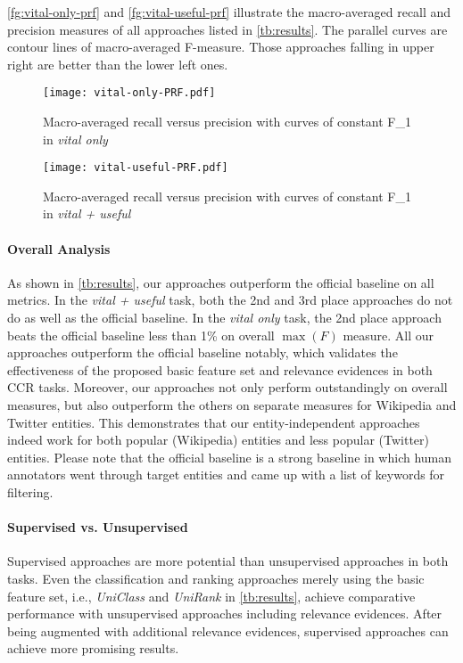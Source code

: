\documentclass{sig-alternate}
\begin{document}
\autoref{fg:vital-only-prf} and \autoref{fg:vital-useful-prf} illustrate the macro-averaged recall and precision measures of all approaches listed in \autoref{tb:results}. The parallel curves are contour lines of macro-averaged F-measure. Those approaches falling in upper right are better than the lower left ones.

\begin{figure}[thbp]
\centering
\texttt{[image: vital-only-PRF.pdf]}
\caption{Macro-averaged recall versus precision with curves of constant F\_1 in \textit{vital only}}
\label{fg:vital-only-prf}
\end{figure}
\begin{figure}[thbp]
\centering
\texttt{[image: vital-useful-PRF.pdf]}
\caption{Macro-averaged recall versus precision with curves of constant F\_1 in \textit{vital + useful}}
\label{fg:vital-useful-prf}
\end{figure}

\paragraph{Overall Analysis}
As shown in \autoref{tb:results}, our approaches outperform the official baseline on all metrics. In the \textit{vital + useful} task, both the 2nd and 3rd place approaches do not do as well as the official baseline. In the \textit{vital only} task, the 2nd place approach beats the official baseline less than 1\% on overall $\max(F)$ measure. All our approaches outperform the official baseline notably, which validates the effectiveness of the proposed basic feature set and relevance evidences in both CCR tasks. Moreover, our approaches not only perform outstandingly on overall measures, but also outperform the others on separate measures for Wikipedia and Twitter entities. This demonstrates that our entity-independent approaches indeed work for both popular (Wikipedia) entities and less popular (Twitter) entities. Please note that the official baseline is a strong baseline in which human annotators went through target entities and came up with a list of keywords for filtering.
\paragraph{Supervised vs. Unsupervised} 
Supervised approaches are more potential than unsupervised approaches in both tasks. Even the classification and ranking approaches merely using the basic feature set, i.e., \textit{UniClass} and \textit{UniRank} in \autoref{tb:results}, achieve comparative performance with unsupervised approaches including relevance evidences. After being augmented with additional relevance evidences, supervised approaches can achieve more promising results.	
\end{document}
